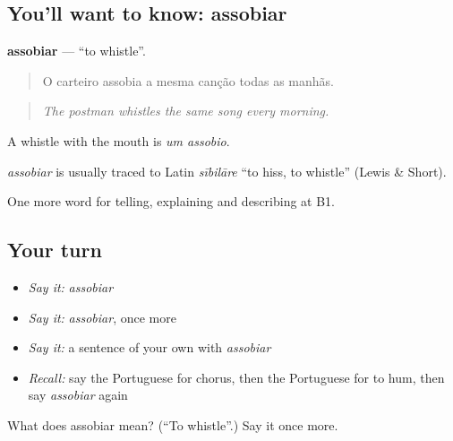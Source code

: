 \subsection*{You'll want to know: assobiar}
\textbf{assobiar} — \textquotedblleft{}to whistle\textquotedblright{}.

\begin{quote}
O carteiro assobia a mesma canção todas as manhãs.
\end{quote}

\begin{quote}
\emph{The postman whistles the same song every morning.}
\end{quote}

A whistle with the mouth is \emph{um assobio}.

\begin{cousinweb}
\emph{assobiar} is usually traced to Latin \emph{sībilāre} \textquotedblleft{}to hiss, to whistle\textquotedblright{} (Lewis \& Short).
\end{cousinweb}

\begin{grammarlens}[title={What you've built}]
One more word for telling, explaining and describing at B1.
\end{grammarlens}

\subsection*{Your turn}
\begin{itemize}
\raggedright
  \item \emph{Say it:} \emph{assobiar}
  \item \emph{Say it:} \emph{assobiar}, once more
  \item \emph{Say it:} a sentence of your own with \emph{assobiar}
  \item \emph{Recall:} say the Portuguese for chorus, then the Portuguese for to hum, then say \emph{assobiar} again
\end{itemize}

\begin{tcolorbox}[breakable,colback=teal!4,colframe=teal!35!black,title={Before you move on}]
What does assobiar mean? (\textquotedblleft{}To whistle\textquotedblright{}.) Say it once more.
\end{tcolorbox}
